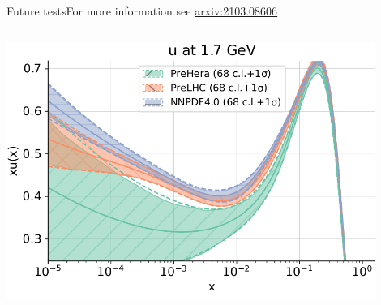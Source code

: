 \documentclass[aspectratio=169,10pt]{beamer}
\begin{document}
\begin{frame}[t]{Future tests}{For more information see \href{https://arxiv.org/pdf/2103.08606.pdf}{\color{blue} arxiv:2103.08606}}
\begin{columns}
        \includegraphics[width=0.9\textwidth]{future_test/diffu}
    \end{columns}
\end{frame}
\end{document}

